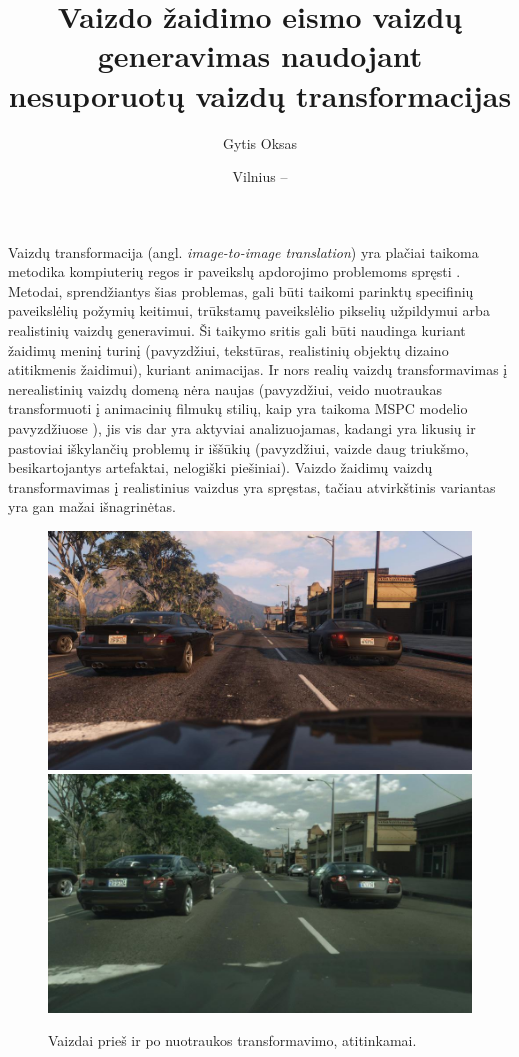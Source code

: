 \documentclass{VUMIFPSbakalaurinis}
\institute{Informatikos institutas}
\title{Vaizdo žaidimo eismo vaizdų generavimas naudojant nesuporuotų vaizdų transformacijas}
\author{Gytis Oksas}
\date{Vilnius – \the\year}
\begin{document}
\maketitle

    Vaizdų transformacija (angl. \emph{image-to-image  translation}) yra plačiai taikoma metodika kompiuterių regos ir paveikslų apdorojimo problemoms spręsti \cite{ImTImTr}. Metodai, sprendžiantys šias problemas, gali būti taikomi parinktų specifinių paveikslėlių požymių keitimui, trūkstamų paveikslėlio pikselių užpildymui arba realistinių vaizdų generavimui. Ši taikymo sritis gali būti naudinga kuriant žaidimų meninį turinį (pavyzdžiui, tekstūras, realistinių objektų dizaino atitikmenis žaidimui), kuriant animacijas. Ir nors realių vaizdų transformavimas į nerealistinių vaizdų domeną nėra naujas (pavyzdžiui, veido nuotraukas transformuoti į animacinių filmukų stilių, kaip yra taikoma MSPC modelio pavyzdžiuose \cite{Mspc}), jis vis dar yra aktyviai analizuojamas, kadangi yra likusių ir pastoviai iškylančių problemų ir iššūkių (pavyzdžiui, vaizde daug triukšmo, besikartojantys artefaktai, nelogiški piešiniai). Vaizdo žaidimų vaizdų transformavimas į realistinius vaizdus yra spręstas, tačiau atvirkštinis variantas yra gan mažai išnagrinėtas.

    \begin{figure}[H]
        \centering
        \includegraphics[scale=0.3]{img/EnPhEn_before}
        \includegraphics[scale=0.3]{img/EnPhEn_after}
        \caption{Vaizdai prieš ir po nuotraukos transformavimo, atitinkamai.\cite{EnPhEn}}
        \label{img:mlp}
    \end{figure}
    
\end{document}
